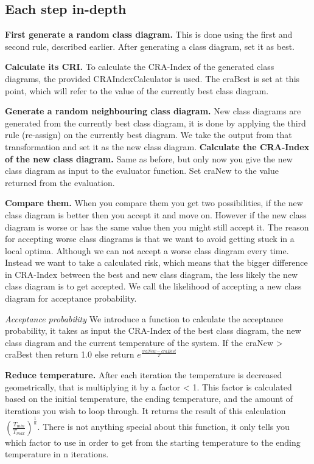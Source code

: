 \documentclass[a4paper]{article}
\begin{document}
\subsection{Each step in-depth}

\textbf{First generate a random class diagram.}
This is done using the first and second rule, described earlier.
After generating a class diagram, set it as best.

\textbf{Calculate its CRI.}
To calculate the CRA-Index of the generated class diagrams, the provided CRAIndexCalculator is used.
The craBest is set at this point, which will refer to the value of the currently best class diagram.

\textbf{Generate a random neighbouring class diagram.}
New class diagrams are generated from the currently best class diagram, it is
done by applying the third rule (re-assign) on the currently best diagram.
We take the output from that transformation and set it as the new class diagram.
\textbf{Calculate the CRA-Index of the new class diagram.}
Same as before, but only now you give the new class diagram as input to the
evaluator function.
Set craNew to the value returned from the evaluation.

\textbf{Compare them.}
When you compare them you get two possibilities, if the new class diagram is better then you accept it and move on.
However if the new class diagram is worse or has the same value then you might still accept it.
The reason for accepting worse class diagrams is that we want to avoid getting stuck in a local optima.
Although we can not accept a worse class diagram every time.
Instead we want to take a calculated risk, which means that the bigger difference in CRA-Index between the best and new class diagram, the less likely the new class diagram is to get accepted.
We call the likelihood of accepting a new class diagram for acceptance probability.

\textit{Acceptance probability}
We introduce a function to calculate the acceptance probability, it takes as input the CRA-Index of the best class diagram, the new class diagram and the current temperature of the system.
If the craNew > craBest then return 1.0 else return $e^\frac{craNew - craBest}{T}$

\textbf{Reduce temperature.}
After each iteration the temperature is decreased geometrically, that is multiplying it by a factor < 1.
This factor is calculated based on the initial temperature, the ending temperature, and the amount of iterations you wish to loop through.
It returns the result of this calculation $(\frac{T_{min}}{T_{max}})^\frac{1}{n}$.
There is not anything special about this function, it only tells you which factor to use in order to get from the starting temperature to the ending temperature in n
iterations.
\end{document}
